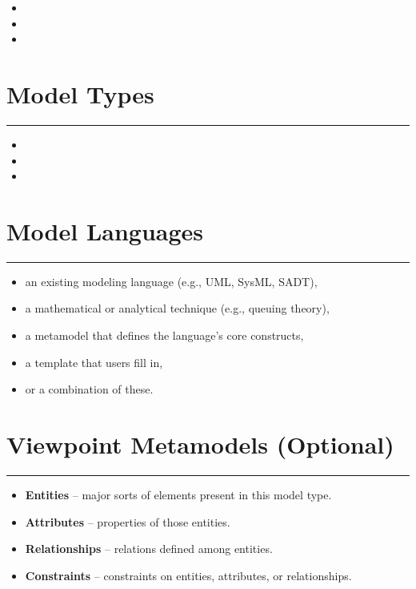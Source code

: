 \documentclass[11pt]{article}
\begin{document}
\vspace{0.5em}
\begin{itemize}[nosep]
  \item
  \item
  \item
\end{itemize}

\vspace{2em}

\section*{Model Types}
\noindent\rule{0.72\linewidth}{0.4pt}

\vspace{0.5em}
\begin{itemize}[nosep]
  \item
  \item
  \item
\end{itemize}

\vspace{2em}

\section*{Model Languages}
\noindent\rule{0.72\linewidth}{0.4pt}
\begin{itemize}[nosep]
  \item an existing modeling language (e.g., UML, SysML, SADT),
  \item a mathematical or analytical technique (e.g., queuing theory),
  \item a metamodel that defines the language’s core constructs,
  \item a template that users fill in,
  \item or a combination of these.
\end{itemize}

\vspace{4em}

\section*{Viewpoint Metamodels (Optional)}
\noindent\rule{0.72\linewidth}{0.4pt}
\begin{itemize}[nosep]
  \item \textbf{Entities} – major sorts of elements present in this model type.
  \item \textbf{Attributes} – properties of those entities.
  \item \textbf{Relationships} – relations defined among entities.
  \item \textbf{Constraints} – constraints on entities, attributes, or
        relationships.
\end{itemize}
\end{document}
